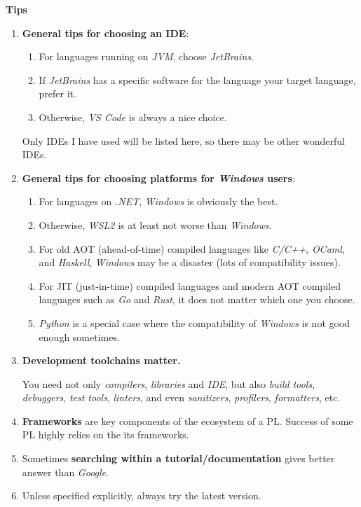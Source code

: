 \documentclass{article}
\begin{document}
\textbf{Tips}
\begin{enumerate}
    \item \textbf{General tips for choosing an IDE}:
    \begin{enumerate}
        \item For languages running on \emph{JVM}, choose \emph{JetBrains}.
        \item If \emph{JetBrains} has a specific software for the language your target language, prefer it.
        \item Otherwise, \emph{VS Code} is always a nice choice.
    \end{enumerate}
        Only IDEs I have used will be listed here, so there may be other wonderful IDEs.
    \item \textbf{General tips for choosing platforms for \emph{Windows} users}:
    \begin{enumerate}
        \item For languages on \emph{.NET}, \emph{Windows} is obviously the best.
        \item Otherwise, \emph{WSL2} is at least not worse than \emph{Windows}.
        \item For old AOT (ahead-of-time) compiled languages like \emph{C/C++}, \emph{OCaml}, and \emph{Haskell}, \emph{Windows} may be a disaster (lots of compatibility issues).
        \item For JIT (just-in-time) compiled languages and modern AOT compiled languages such as \emph{Go} and \emph{Rust}, it does not matter which one you choose.
        \item \emph{Python} is a special case where the compatibility of \emph{Windows} is not good enough sometimes.
    \end{enumerate}
    \item \textbf{Development toolchains matter.}
    
    You need not only \emph{compilers}, \emph{libraries} and \emph{IDE}, but also \emph{build tools}, \emph{debuggers}, \emph{test tools}, \emph{linters}, and even \emph{sanitizers}, \emph{profilers}, \emph{formatters}, etc.
    
    \item \textbf{Frameworks} are key components of the ecosystem of a PL.
    Success of some PL highly relies on the its frameworks.
    \item Sometimes \textbf{searching within a tutorial/documentation} gives better answer than \emph{Google}.
    \item Unless specified explicitly, always try the latest version.
\end{enumerate}
\end{document}
